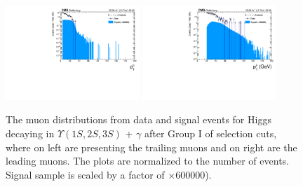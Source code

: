 


\begin{figure}[!htbp]
\begin{center}
\includegraphics[width=0.45\textwidth]{figures_and_tables/outputPlots/HtoUpsilon_Cat0_ZZZZZ/nEvts/data_x_mc/withKinCuts/h_withKin_TrailingMu_pt}\hspace*{1.cm}
\includegraphics[width=0.45\textwidth]{figures_and_tables/outputPlots/HtoUpsilon_Cat0_ZZZZZ/nEvts/data_x_mc/withKinCuts/h_withKin_LeadingMu_pt}
\end{center}\vspace*{-.5cm}
\caption{The \PT muon distributions from data and signal events for Higgs decaying in $\Upsilon(1S,2S,3S)$ + $\gamma$ after Group I of selection cuts, where on left are presenting the trailing muons and on right are the leading muons. The plots are normalized to the number of events. Signal sample is scaled by a factor of $\times 600000$).}
\label{fig:pTMuons_HtoUpsilon_Cat0_groupI_plus_II}
\end{figure}


